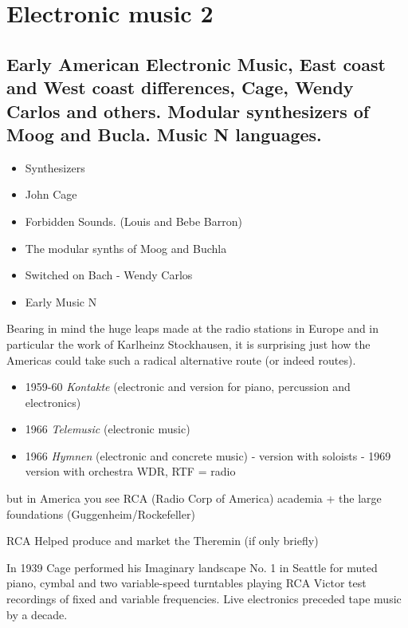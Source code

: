 
\chapter{Electronic music 2}
\label{history2}

\section{Early American Electronic Music, East coast and West coast differences, Cage, Wendy Carlos and others. Modular synthesizers of Moog and Bucla. Music N languages.}
\begin{itemize}
\item Synthesizers
\item John Cage
\item Forbidden Sounds. (Louis and Bebe Barron)
\item The modular synths of Moog and Buchla
\item Switched on Bach - Wendy Carlos
\item Early Music N
\end{itemize}

Bearing in mind the huge leaps made at the radio stations in Europe and in particular the work of Karlheinz Stockhausen, it is surprising just how the Americas could take such a radical alternative route (or indeed routes).

\begin{itemize}
\item 1959-60 \textit{Kontakte} (electronic and version for piano, percussion and electronics)
\item 1966 \textit{Telemusic} (electronic music)
\item 1966 \textit{Hymnen} (electronic and concrete music) - version with soloists - 1969 version with orchestra
WDR, RTF = radio
\end{itemize}

but in America you see RCA (Radio Corp of America) academia + the large foundations (Guggenheim/Rockefeller)

RCA Helped produce and market the Theremin (if only briefly)

In 1939 Cage performed his Imaginary landscape No. 1 in Seattle for muted piano, cymbal and two variable-speed turntables playing RCA Victor test recordings of fixed and variable frequencies. Live electronics preceded tape music by a decade.

